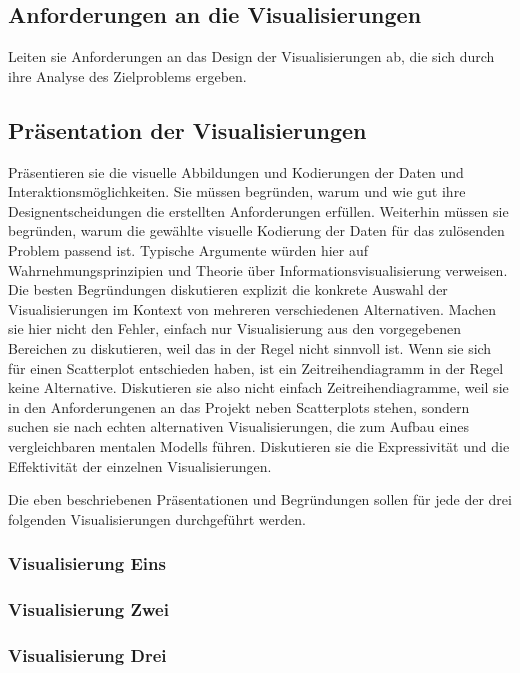 \documentclass[usegeometry=true]{scrartcl}
\begin{document}
\subsection{Anforderungen an die Visualisierungen}
Leiten sie Anforderungen an das Design der Visualisierungen ab, die sich durch ihre Analyse des Zielproblems ergeben.
\subsection{Präsentation der Visualisierungen}
Präsentieren sie die visuelle Abbildungen und Kodierungen der Daten und Interaktionsmöglichkeiten. 
Sie müssen  begründen, warum und wie gut ihre Designentscheidungen die erstellten Anforderungen erfüllen. 
Weiterhin müssen sie begründen, warum die gewählte visuelle Kodierung der Daten für das zulösenden Problem passend ist.
Typische Argumente würden hier auf Wahrnehmungsprinzipien und Theorie über Informationsvisualisierung verweisen. 
Die besten Begründungen diskutieren explizit die konkrete Auswahl der Visualisierungen im Kontext von mehreren verschiedenen Alternativen. 
Machen sie hier nicht den Fehler, einfach nur Visualisierung aus den vorgegebenen Bereichen zu diskutieren, weil das in der Regel nicht sinnvoll ist.
Wenn sie sich für einen Scatterplot entschieden haben, ist ein Zeitreihendiagramm in der Regel keine Alternative.
Diskutieren sie also nicht einfach Zeitreihendiagramme, weil sie in den Anforderungenen an das Projekt neben Scatterplots stehen, sondern suchen sie nach echten alternativen Visualisierungen, die zum Aufbau eines vergleichbaren mentalen Modells führen. 
Diskutieren sie die Expressivität und die Effektivität der einzelnen Visualisierungen. 

Die eben beschriebenen Präsentationen und Begründungen sollen für jede der drei folgenden Visualisierungen durchgeführt werden. 
\subsubsection{Visualisierung Eins}
\subsubsection{Visualisierung Zwei}
\subsubsection{Visualisierung Drei}
\end{document}

